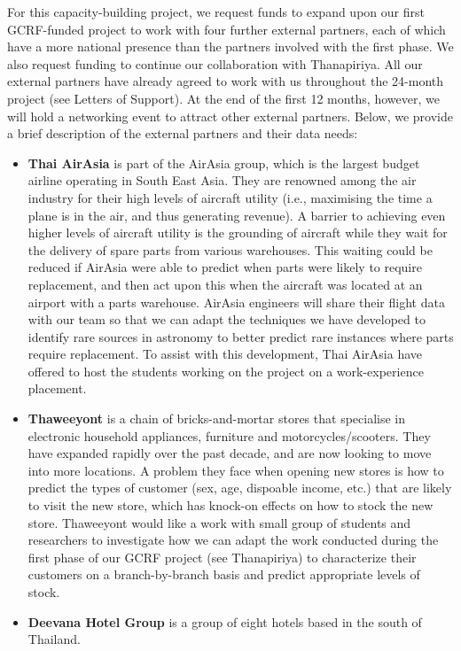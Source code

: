 \documentclass[11pt]{article}
\begin{document}
  For this capacity-building project, we request funds to expand upon our first GCRF-funded project to work with four further external partners, each of which have a more national presence than the partners involved with the first phase. We also request funding to continue our collaboration with Thanapiriya. All our external partners have already agreed to work with us throughout the 24-month project (see Letters of Support). At the end of the first 12 months, however, we will hold a networking event to attract other external partners. Below, we provide a brief description of the external partners and their data needs:
  
  \begin{itemize}
  \item {\bf Thai AirAsia} is part of the AirAsia group, which is the largest budget airline operating in South East Asia. They are renowned among the air industry for their high levels of aircraft utility (i.e., maximising the time a plane is in the air, and thus generating revenue). A barrier to achieving even higher levels of aircraft utility is the grounding of aircraft while they wait for the delivery of spare parts from various warehouses. This waiting could be reduced if AirAsia were able to predict when parts were likely to require replacement, and then act upon this when the aircraft was located at an airport with a parts warehouse. AirAsia engineers will share their flight data with our team so that we can adapt the techniques we have developed to identify rare sources in astronomy to better predict rare instances where parts require replacement. To assist with this development, Thai AirAsia have offered to host the students working on the project on a work-experience placement.
  \item {\bf Thaweeyont} is a chain of bricks-and-mortar stores that specialise in electronic household appliances, furniture and motorcycles/scooters. They have expanded rapidly over the past decade, and are now looking to move into more locations. A problem they face when opening new stores is how to predict the types of customer (sex, age, dispoable income, etc.) that are likely to visit the new store, which has knock-on effects on how to stock the new store. Thaweeyont would like a work with small group of students and researchers to investigate how we can adapt the work conducted during the first phase of our GCRF project (see Thanapiriya) to characterize their customers on a branch-by-branch basis and predict appropriate levels of stock.
  \item {\bf Deevana Hotel Group} is a group of eight hotels based in the south of Thailand.
\end{itemize}
\end{document}
